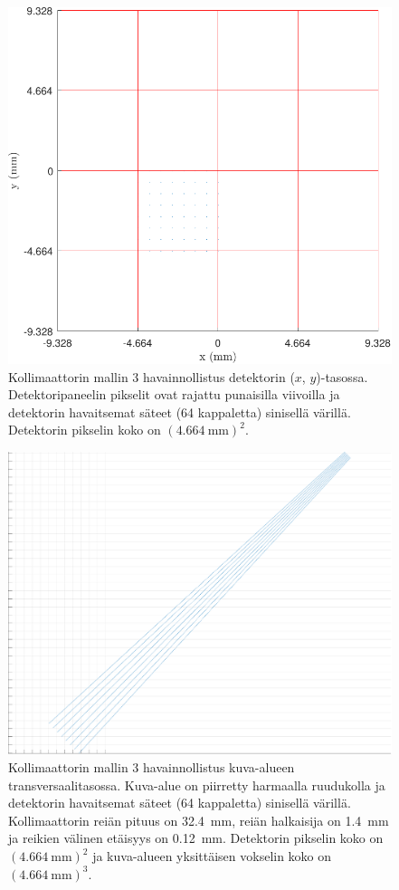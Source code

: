 \begin{figure}[H]
    \centering
    \captionsetup{width=.9\linewidth}
    \includegraphics[width=.9\linewidth]{kuvat/malli3_2D.pdf}
    \caption{Kollimaattorin mallin 3 havainnollistus detektorin ($x$, $y$)-tasossa. Detektoripaneelin pikselit ovat rajattu punaisilla viivoilla ja detektorin havaitsemat säteet (64 kappaletta) sinisellä värillä. Detektorin pikselin koko on $(\qty{4.664}{\milli\meter})^2$.}
    \label{fig:ray3_2D}
\end{figure}
\begin{figure}[H]
    \centering
    \captionsetup{width=.9\linewidth}
    \includegraphics[width=.9\linewidth]{kuvat/malli3_3D.pdf}
    \caption{Kollimaattorin mallin 3 havainnollistus kuva-alueen transversaalitasossa. Kuva-alue on piirretty harmaalla ruudukolla ja detektorin havaitsemat säteet (64 kappaletta) sinisellä värillä. Kollimaattorin reiän pituus on \qty{32.4}{\milli\meter}, reiän halkaisija on \qty{1.4}{\milli\meter} ja reikien välinen etäisyys on \qty{0.12}{\milli\meter}. Detektorin pikselin koko on $(\qty{4.664}{\milli\meter})^2$ ja kuva-alueen yksittäisen vokselin koko on $(\qty{4.664}{\milli\meter})^{3}$.}
    \label{fig:ray3_3D}
\end{figure}


